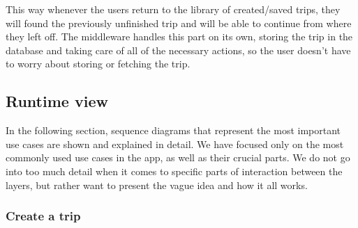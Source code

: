 This way whenever the users return to the library of created/saved trips, they will found the previously unfinished trip and will be able to continue from where they left off. The middleware handles this part on its own, storing the trip in the database and taking care of all of the necessary actions, so the user doesn't have to worry about storing or fetching the trip. 

\subsection{Runtime view}

\hspace{\parindent}In the following section, sequence diagrams that represent the most important use cases are shown and explained in detail. We have focused only on the most commonly used use cases in the app, as well as their crucial parts. We do not go into too much detail when it comes to specific parts of interaction between the layers, but rather want to present the vague idea and how it all works.
\newpage
\subsubsection{Create a trip}

